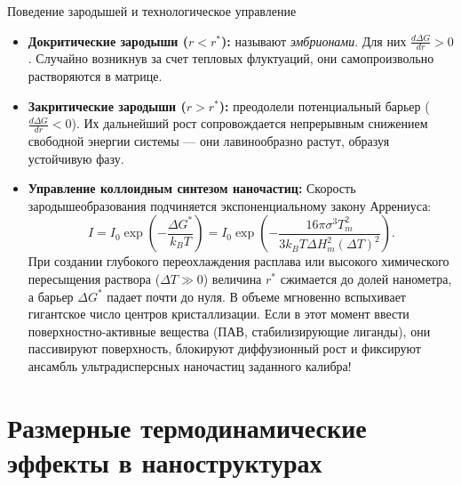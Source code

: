\documentclass[12pt,a4paper]{article}
\begin{document}
\begin{lawbox}{Поведение зародышей и технологическое управление}
\begin{itemize}
    \item \textbf{Докритические зародыши ($r < r^*$):} называют \textit{эмбрионами}. Для них $\frac{d\Delta G}{dr} > 0$. Случайно возникнув за счет тепловых флуктуаций, они самопроизвольно растворяются в матрице.
    \item \textbf{Закритические зародыши ($r > r^*$):} преодолели потенциальный барьер ($\frac{d\Delta G}{dr} < 0$). Их дальнейший рост сопровождается непрерывным снижением свободной энергии системы --- они лавинообразно растут, образуя устойчивую фазу.
    \item \textbf{Управление коллоидным синтезом наночастиц:}
    Скорость зародышеобразования подчиняется экспоненциальному закону Аррениуса:
    \begin{equation}
    I = I_0 \exp\left(-\frac{\Delta G^*}{k_B T}\right) = I_0 \exp\left(-\frac{16\pi \sigma^3 T_m^2}{3 k_B T \Delta H_m^2 (\Delta T)^2}\right).
    \label{eq:arrhenius_nucleation}
    \end{equation}
    При создании глубокого переохлаждения расплава или высокого химического пересыщения раствора ($\Delta T \gg 0$) величина $r^*$ сжимается до долей нанометра, а барьер $\Delta G^*$ падает почти до нуля. В объеме мгновенно вспыхивает гигантское число центров кристаллизации. Если в этот момент ввести поверхностно-активные вещества (ПАВ, стабилизирующие лиганды), они пассивируют поверхность, блокируют диффузионный рост и фиксируют ансамбль ультрадисперсных наночастиц заданного калибра!
\end{itemize}
\end{lawbox}

\section{Размерные термодинамические эффекты в наноструктурах}
\label{sec:size_effects}
\end{document}
